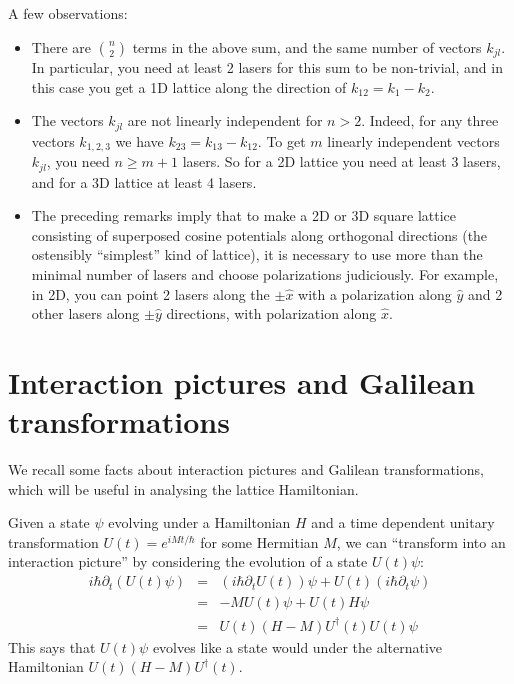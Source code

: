 \documentclass[aps,prb,floatfix,amsmath,amssymb,groupedaddress]{revtex4}
\begin{document}
A few observations:
\begin{itemize}
\item There are $\binom{n}{2}$ terms in the above sum, and the same number of vectors $k_{jl}$.  In particular, you need at least 2 lasers for this sum to be non-trivial, and in this case you get a 1D lattice along the direction of $k_{12} = k_1-k_2$.
\item The vectors $k_{jl}$ are not linearly independent for $n>2$.  Indeed, for any three vectors $k_{1,2,3}$ we have $k_{23} = k_{13}-k_{12}$.  To get $m$ linearly independent vectors $k_{jl}$, you need $n\geq m+1$ lasers.  So for a 2D lattice you need at least 3 lasers, and for a 3D lattice at least 4 lasers.  
\item The preceding remarks imply that to make a 2D or 3D square lattice consisting of superposed cosine potentials along orthogonal directions (the ostensibly ``simplest'' kind of lattice), it is necessary to use more than the minimal number of lasers and choose polarizations judiciously.  For example, in 2D, you can point 2 lasers along the $\pm\hat{x}$ with a polarization along $\hat{y}$ and 2 other lasers along $\pm \hat{y}$ directions, with polarization along $\hat{x}$.
\end{itemize}

\section{Interaction pictures and Galilean transformations} %
We recall some facts about interaction pictures and Galilean transformations, which will be useful in analysing the lattice Hamiltonian.

Given a state $\psi$ evolving under a Hamiltonian $H$ and a time dependent unitary transformation $U(t) = e^{i M t/\hbar}$ for some Hermitian $M$, we can ``transform into an interaction picture'' by considering the evolution of a state $U(t) \psi$:
\begin{eqnarray*}
i\hbar\partial_t \left(U(t) \psi\right) & = & \left(i\hbar\partial_t U(t)\right) \psi + U(t) \left(i\hbar\partial_t \psi\right) \\
& = & - M U(t) \psi + U(t) H \psi \\
& = & U(t) \left(H-M\right)U^\dagger(t) U(t)\psi
\end{eqnarray*}
This says that $U(t)\psi$ evolves like a state would under the alternative Hamiltonian $U(t) \left(H-M\right)U^\dagger(t)$.

\end{document}
